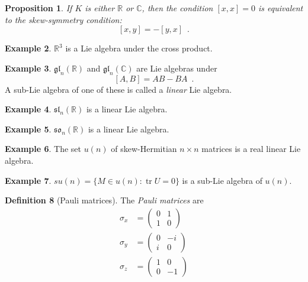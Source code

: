\documentclass{book}
\newtheorem{prop}{Proposition}[chapter]
\theoremstyle{definition}
\newtheorem{df}[prop]{Definition}
\newtheorem{ex}[prop]{Example}
\newcommand{\gl}[2]{\ensuremath{\mathfrak{gl}_{#1} \left( {#2} \right)}}
\renewcommand{\sl}[2]{\ensuremath{\mathfrak{sl}_{#1} \left( {#2} \right)}}
\newcommand{\so}[2]{\ensuremath{\mathfrak{so}_{#1} \left( {#2} \right)}}
\newcommand{\tr}{\ensuremath{\operatorname{tr}}}
\begin{document}
\begin{prop}
If $K$ is either $\mathbb{R}$ or $\mathbb{C}$, then the condition $[x,x] = 0$ is equivalent to the \emph{skew-symmetry condition}:
\[ [x,y] = -[y,x] \enspace . \]
\end{prop}


\begin{ex}
$\mathbb{R}^3$ is a Lie algebra under the cross product.
\end{ex}

\begin{ex}
$\gl
{n}{\mathbb{R}}$ and $\gl{n}{\mathbb{C}}$ are Lie algebras under
\[ [A,B] = AB - BA \enspace . \]
A sub-Lie algebra of one of these is called a \emph{linear} Lie algebra.
\end{ex}

\begin{ex}
$\sl{n}{\mathbb{R}}$ is a linear Lie algebra.
\end{ex}

\begin{ex}
$\so{n}{\mathbb{R}}$ is a linear Lie algebra.
\end{ex}

\begin{ex}
The set $u(n)$ of skew-Hermitian $n \times n$ matrices is a real linear Lie algebra.
\end{ex}

\begin{ex}
$su(n) = \{ M \in u(n) : \tr U = 0 \}$ is a sub-Lie algebra of $u(n)$.
\end{ex}

\begin{df}[Pauli matrices]
The \emph{Pauli matrices} are
\begin{align*}
\sigma_x & = \left( \begin{array}{cc}
0 & 1 \\ 1 & 0
\end{array} \right) \\
\sigma_y & = \left( \begin{array}{cc}
0 & -i \\ i & 0
\end{array} \right) \\
\sigma_z & = \left( \begin{array}{cc}
1 & 0 \\ 0 & -1
\end{array} \right)
\end{align*}
\end{df}
\end{document}
